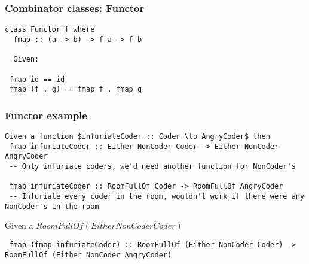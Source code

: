 \documentclass{beamer}
\begin{document}


\begin{frame}
\frametitle{Combinator classes: Functor}

\begin{lstlisting}
class Functor f where
  fmap :: (a -> b) -> f a -> f b

  Given:

 fmap id == id
 fmap (f . g) == fmap f . fmap g
\end{lstlisting}

\end{frame}


%
%


\begin{frame}
\frametitle{Functor example}

\begin{lstlisting}
Given a function $infuriateCoder :: Coder \to AngryCoder$ then
 fmap infuriateCoder :: Either NonCoder Coder -> Either NonCoder AngryCoder
 -- Only infuriate coders, we'd need another function for NonCoder's

 fmap infuriateCoder :: RoomFullOf Coder -> RoomFullOf AngryCoder
 -- Infuriate every coder in the room, wouldn't work if there were any NonCoder's in the room
\end{lstlisting}


Given a $RoomFullOf (Either NonCoder Coder)$

\begin{lstlisting}
 fmap (fmap infuriateCoder) :: RoomFullOf (Either NonCoder Coder) -> RoomFullOf (Either NonCoder AngryCoder)
\end{lstlisting}

\end{frame}
\end{document}
